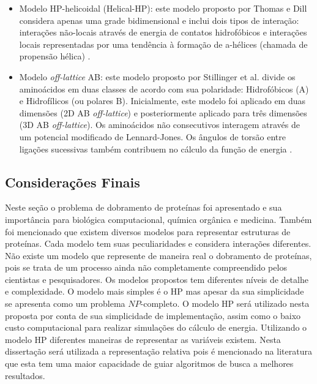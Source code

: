 \begin{itemize}
	\item Modelo HP-helicoidal (Helical-HP): este modelo proposto por Thomas e Dill \cite{thomas1993local} considera apenas uma grade bidimensional e inclui dois tipos de interação: interações não-locais através de energia de contatos hidrofóbicos e interações locais representadas por uma tendência à formação de a-hélices (chamada de propensão hélica) \cite{benitez2015algoritmo}.
	\item Modelo \textit{off-lattice} AB: este modelo proposto por Stillinger et al. \cite{stillinger1993toy} divide os aminoácidos em duas classes de acordo com sua polaridade: Hidrofóbicos (A) e Hidrofílicos (ou polares  B). Inicialmente, este modelo foi aplicado em duas dimensões (2D AB \textit{off-lattice}) e posteriormente aplicado para três dimensões (3D AB \textit{off-lattice}). Os aminoácidos não consecutivos interagem através de um potencial modificado de Lennard-Jones. Os ângulos de torsão entre ligações sucessivas também contribuem no cálculo da função de energia \cite{benitez2015algoritmo}.
	
\end{itemize}




\subsection{Considerações Finais}
\label{Problema de Dobramento de Proteínas:Consideracoes Finais}

Neste seção o problema de dobramento de proteínas foi apresentado e sua importância para biológica computacional, química orgânica e medicina. Também foi mencionado que existem diversos modelos para representar estruturas de proteínas. Cada modelo tem suas peculiaridades e considera interações diferentes. Não existe um modelo que represente de maneira real o dobramento de proteínas, pois se trata de um processo ainda não completamente compreendido pelos cientistas e pesquisadores. Os modelos propostos tem diferentes níveis de detalhe e complexidade. O modelo mais simples é o HP mas apesar da sua simplicidade se apresenta como um problema $NP$-completo. O modelo HP será utilizado nesta proposta por conta de sua simplicidade de implementação, assim como o baixo custo computacional para realizar simulações do cálculo de energia. Utilizando o modelo HP diferentes maneiras de representar as variáveis existem. Nesta dissertação será utilizada a representação relativa pois é mencionado na literatura que esta tem uma maior capacidade de guiar algoritmos de busca a melhores resultados.


